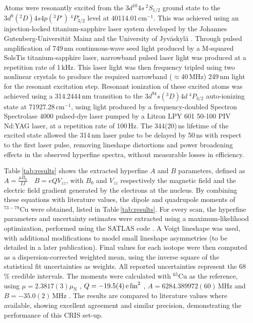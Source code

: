 \documentclass[reprint,superscriptaddress,amsmath,amssymb,aps,prl]{revtex4-1}
\begin{document}
Atoms were resonantly excited from the $3d^{10}4s \ ^2S_{1/2}$ ground state to the $3d^9(^2D)4s4p(^3P^\circ) \ ^4P^\circ_{3/2}$ level at 40114.01\,cm$^{-1}$. This was achieved using an injection-locked titanium-sapphire laser system developed by the Johannes Gutenberg-Universit\"{a}t Mainz and the University of Jyv\"{a}skyl\"{a} \cite{Kessler2008,Sonnenschein2017}. Through pulsed amplification of 749\,nm continuous-wave seed light produced by a M-squared SolsTis titanium-sapphire laser, narrowband pulsed laser light was produced at a repetition rate of 1\,kHz. This laser light was then frequency tripled using two nonlinear crystals to produce the required narrowband ($\approx$40\,MHz) 249\,nm light for the resonant excitation step. Resonant ionization of these excited atoms was achieved using a 314.2444\,nm transition to the $3d^94s(^3D)4d \ ^4P_{3/2}$ auto-ionizing state at 71927.28\,cm$^{-1}$, using light produced by a frequency-doubled Spectron Spectrolase 4000 pulsed-dye laser pumped by a Litron LPY 601 50-100 PIV Nd:YAG laser, at a repetition rate of 100\,Hz. The 344(20)\,ns lifetime \cite{Kono1982} of the excited state allowed the 314\,nm laser pulse to be delayed by 50\,ns with respect to the first laser pulse, removing lineshape distortions and power broadening effects \cite{deGroote2015,deGroote2017} in the observed hyperfine spectra, without measurable losses in efficiency.

Table\,\ref{tab:results} shows the extracted hyperfine $A$ and $B$ parameters, defined as $A = \frac{\mu B_0}{IJ} \quad B = e Q V_{zz}$, with $B_0$ and $V_{zz}$ respectively the magnetic field and the electric field gradient generated by the electrons at the nucleus. By combining these equations with literature values, the dipole and quadrupole moments of $^{73-78}$Cu were obtained, listed in Table\,\ref{tab:results}. For every scan, the hyperfine parameters and uncertainty estimates were extracted using a maximum-likelihood optimization, performed using the SATLAS code \cite{Gins2017}. A Voigt lineshape was used, with additional modifications to model small lineshape asymmetries (to be detailed in a later publication). Final values for each isotope were then computed as a dispersion-corrected weighted mean, using the inverse square of the statistical fit uncertainties as weights. All reported uncertainties represent the 68\,\% credible intervals. The moments were calculated with $^{65}$Cu as the reference, using $\mu = 2.3817(3)\mu_{\text{N}}$ \cite{Lutz1978}, $Q = -19.5(4)\,\text{e\,fm}^2$ \cite{Sternheimer1972,stone2005}, $A=6284.389972(60)$\,MHz \cite{Figger1967} and $B=-35.0(2)$\,MHz \cite{Bucka1967}. The results are compared to literature values where available, showing excellent agreement and similar precision, demonstrating the performance of this CRIS set-up.
\end{document}
